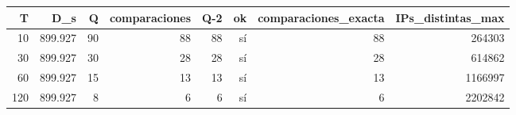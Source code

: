 \begin{tabular}{rrrrrrrr}
\toprule
T & D\_s & Q & comparaciones & Q-2 & ok & comparaciones\_exacta & IPs\_distintas\_max \\
\midrule
10 & 899.927 & 90 & 88 & 88 & sí & 88 & 264303 \\
30 & 899.927 & 30 & 28 & 28 & sí & 28 & 614862 \\
60 & 899.927 & 15 & 13 & 13 & sí & 13 & 1166997 \\
120 & 899.927 & 8 & 6 & 6 & sí & 6 & 2202842 \\
\bottomrule
\end{tabular}
